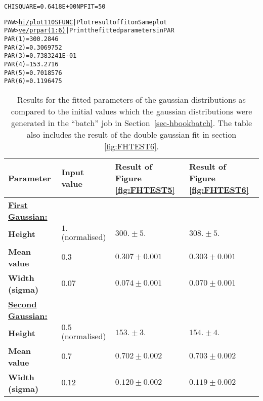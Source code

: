 \begin{alltt}
CHISQUARE = 0.6418E+00  NPFIT =   50
 
PAW > \underline{hi/plot 110 SFUNC}     | Plot result of fit on Same plot
PAW > \underline{ve/pr par(1:6)}        | Print the fitted parameters in PAR
PAR (    1 ) =   300.2846
PAR (    2 ) =  0.3069752
PAR (    3 ) =  0.7383241E-01
PAR (    4 ) =   153.2716
PAR (    5 ) =  0.7018576
PAR (    6 ) =  0.1196475
\end{alltt}

\begin{table}
\begin{center}
\begin{tabular}{|>{\bf}l|l|l|l|}
\hline
\bf Parameter                     & \bf Input value                   &
\bf Result of Figure \ref{fig:FHTEST5}&
                               \bf Result of Figure \ref{fig:FHTEST6} \\
\hline
\underline{First Gaussian:}       &   &  &                            \\
Height        & $1.$ (normalised) & $300. \pm 5.$   & $308. \pm 5.$   \\
Mean value    & $0.3$             & $0.307\pm 0.001$& $0.303\pm 0.001$\\
Width (sigma) & $0.07$            & $0.074\pm 0.001$& $0.070\pm 0.001$\\
\hline
\underline{Second Gaussian:}      &   &  &                            \\
Height        & $0.5$ (normalised)& $153. \pm 3.$   & $154. \pm 4.$   \\
Mean value    & $0.7$             & $0.702\pm 0.002$& $0.703\pm 0.002$\\
Width (sigma) & $0.12$            & $0.120\pm 0.002$& $0.119\pm 0.002$\\
\hline
\end{tabular}
\end{center}

\caption[Comparison of results of fits for
the double gaussian distribution]%
{Results for the fitted parameters of the gaussian distributions as
compared to the initial values which the gaussian distributions were
generated in the ``batch'' job in Section~\protect\ref{sec-hbookbatch}.
The table also includes the result of the double gaussian fit in section 
\protect\ref{fig:FHTEST6}.}
\label{tab:FITRES}
\end{table}

\medskip

